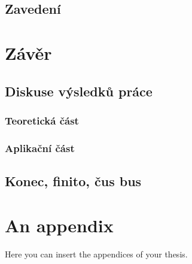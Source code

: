 \documentclass[
  digital,     %
  twoside,     %
  lof,         %
  lot,         %
]{fithesis4}
\begin{document}
\section{Zavedení}

\chapter{Závěr}
\section{Diskuse výsledků práce}
\subsection{Teoretická část}
\subsection{Aplikační část}
\section{Konec, finito, čus bus}

\printbibliography[heading=bibintoc] %

  \makeatletter\thesis@blocks@clear\makeatother
  \printindex

\appendix %
\chapter{An appendix}
Here you can insert the appendices of your thesis.
\end{document}
